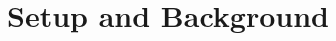 \documentclass{uai2026} %
\newcommand{\1}{\mathbf{1}}
\newcommand{\aymeric}[1]{\textcolor{red}{ad: #1}}
\begin{document}




\section{Setup and Background}
\label{sec:setup}
\label{sec:batch}
\end{document}
